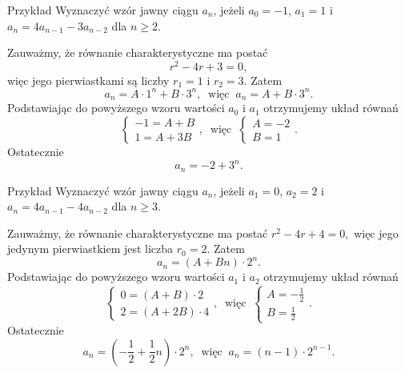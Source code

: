 \documentclass[a4paper,10pt]{beamer}
\begin{document}
\begin{frame}
	
	\begin{exampleblock}{Przykład}
		Wyznaczyć wzór jawny ciągu $a_n$, jeżeli $a_0=-1$, $a_1=1$ i $a_n=4a_{n-1}-3a_{n-2}$ dla $n\geq2$.
		
		Zauważmy, że równanie charakterystyczne ma postać $$r^2-4r+3=0,$$ więc jego pierwiastkami są liczby $r_1=1$ i $r_2=3$. Zatem
		$$a_n=A\cdot1^n+B\cdot3^n,\ \mbox{ więc }\ a_n=A+B\cdot3^n.$$
		Podstawiając do powyższego wzoru wartości $a_0$ i $a_1$ otrzymujemy układ równań
		$$\left\{\begin{array}{l}-1=A+B\\1=A+3B\end{array}\right.,\ \mbox{ więc }\ \left\{\begin{array}{l}A=-2\\B=1\end{array}\right. .$$ Ostatecznie $$a_n=-2+3^n.$$
	\end{exampleblock}
	
\end{frame}


\begin{frame}
	
	\begin{exampleblock}{Przykład}
		Wyznaczyć wzór jawny ciągu $a_n$, jeżeli $a_1=0$, $a_2=2$ i $a_n=4a_{n-1}-4a_{n-2}$ dla $n\geq3$.
		
		Zauważmy, że równanie charakterystyczne ma postać $r^2-4r+4=0,$ więc jego jedynym pierwiastkiem jest liczba $r_0=2$. Zatem
		$$a_n=(A+Bn)\cdot2^n.$$
		Podstawiając do powyższego wzoru wartości $a_1$ i $a_2$ otrzymujemy układ równań
		$$\left\{\begin{array}{l}0=(A+B)\cdot2\\2=(A+2B)\cdot4\end{array}\right.,\ \mbox{ więc }\ \left\{\begin{array}{l}A=-\frac12\\B=\frac12\end{array}\right. .$$ Ostatecznie $$a_n=\left(-\frac12+\frac12n\right)\cdot2^n,\ \mbox{ więc }\ a_n=(n-1)\cdot2^{n-1}.$$
	\end{exampleblock}
	
\end{frame}
\end{document}
